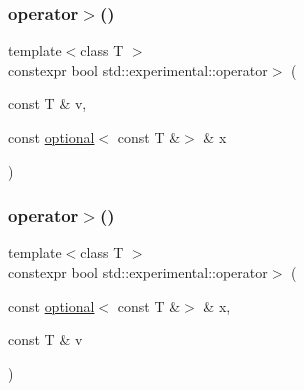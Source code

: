 \mbox{\label{namespacestd_1_1experimental_a3899be1cf909f9d5dc2718c912c73d67}} 
\subsubsection{\texorpdfstring{operator$>$()}{operator>()}\hspace{0.1cm}{\footnotesize\ttfamily [8/9]}}
{\footnotesize\ttfamily template$<$class T $>$ \\
constexpr bool std\+::experimental\+::operator$>$ (\begin{DoxyParamCaption}\item[{const T \&}]{v,  }\item[{const \mbox{\hyperlink{classstd_1_1experimental_1_1optional}{optional}}$<$ const T \&$>$ \&}]{x }\end{DoxyParamCaption})}

\mbox{\label{namespacestd_1_1experimental_ab62a91459215563e8996e69785166789}} 
\subsubsection{\texorpdfstring{operator$>$()}{operator>()}\hspace{0.1cm}{\footnotesize\ttfamily [9/9]}}
{\footnotesize\ttfamily template$<$class T $>$ \\
constexpr bool std\+::experimental\+::operator$>$ (\begin{DoxyParamCaption}\item[{const \mbox{\hyperlink{classstd_1_1experimental_1_1optional}{optional}}$<$ const T \&$>$ \&}]{x,  }\item[{const T \&}]{v }\end{DoxyParamCaption})}

\mbox{\label{namespacestd_1_1experimental_a2c2515ef0e94b6089f60aaf6757741c9}} 
